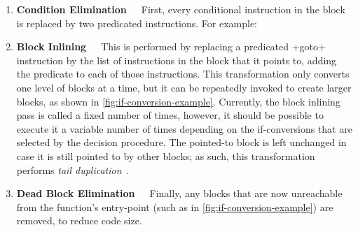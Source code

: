 \begin{enumerate}
\item\textbf{Condition Elimination}~~~First, every conditional instruction in
  the block is replaced by two predicated  instructions. For example:
\begin{center}
\end{center}

\item\textbf{Block Inlining}~~~This is performed by replacing a predicated
  \rtlinline+goto+ instruction by the list of instructions in the block that it
  points to, adding the predicate to each of those instructions. This
  transformation only converts one level of blocks at a time, but it can be
  repeatedly invoked to create larger blocks, as shown in
  \cref{fig:if-conversion-example}.  Currently, the block inlining pass is
  called a fixed number of times, however, it should be possible to execute it a
  variable number of times depending on the if-conversions that are selected by
  the decision procedure.  The pointed-to block is left unchanged in case it is
  still pointed to by other blocks; as such, this transformation performs
  \emph{tail
    duplication}~\cite{chang91_using_profil_infor_assis_class_code_optim}.

\item\textbf{Dead Block Elimination}~~~Finally, any blocks that are now
  unreachable from the function's entry-point (such as
   in \cref{fig:if-conversion-example}) are
    removed, to reduce code size.
\end{enumerate}


